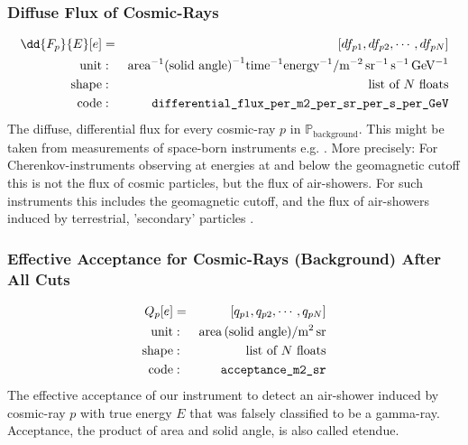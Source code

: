 \documentclass{article}%
\begin{document}
        \subsubsection*{Diffuse Flux of Cosmic-Rays}
            \begin{eqnarray*}
                \dd{F_p}{E}[e] &=& [df_{p1}, df_{p2}, \cdots, df_{pN}]\\
                \text{unit} &:& \text{area}^{-1} \text{(solid angle)}^{-1} \text{time}^{-1} \text{energy}^{-1} / \text{m}^{-2}\, \text{sr}^{-1}\,\text{s}^{-1}\,\text{GeV}^{-1}\\
                \text{shape} &:& \text{list of}\,\,N\,\,\text{floats}\\
                \text{code} &:& \verb|differential_flux_per_m2_per_sr_per_s_per_GeV|
            \end{eqnarray*}
            The diffuse, differential flux for every cosmic-ray $p$ in $\mathbb{P}_\text{background}$. This might be taken from measurements of space-born instruments e.g. \cite{aguilar2014precision,aguilar2015precision}.
            More precisely: For Cherenkov-instruments observing at energies at and below the geomagnetic cutoff this is not the flux of cosmic particles, but the flux of air-showers.
            For such instruments this includes the geomagnetic cutoff, and the flux of air-showers induced by terrestrial, 'secondary' particles \cite{lipari2002fluxes}.
        \subsubsection*{Effective Acceptance for Cosmic-Rays (Background) After All Cuts}
            \begin{eqnarray*}
                Q_p[e] &=& [q_{p1}, q_{p2}, \cdots, q_{pN}]\\
                \text{unit} &:& \text{area} \, \text{(solid angle)} / \text{m}^{2}\,\text{sr}\\
                \text{shape} &:& \text{list of}\,\,N\,\,\text{floats}\\
                \text{code} &:& \verb|acceptance_m2_sr|
            \end{eqnarray*}
            The effective acceptance of our instrument to detect an air-shower induced by cosmic-ray $p$ with true energy $E$ that was falsely classified to be a gamma-ray.
            Acceptance, the product of area and solid angle, is also called etendue.
\end{document}

